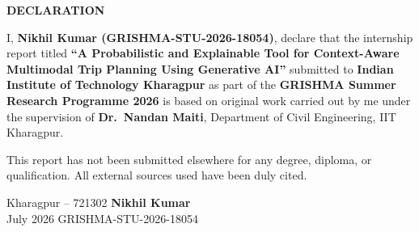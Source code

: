\thispagestyle{front}
\vspace*{0.5cm}
\begin{center}
  \textbf{\Large DECLARATION}
\end{center}
\vspace{1cm}

\noindent
I, \textbf{Nikhil Kumar (GRISHMA-STU-2026-18054)}, declare that the internship
report titled \textbf{``A Probabilistic and Explainable Tool for Context-Aware
Multimodal Trip Planning Using Generative AI''} submitted to \textbf{Indian
Institute of Technology Kharagpur} as part of the \textbf{GRISHMA Summer Research
Programme 2026} is based on original work carried out by me under the supervision
of \textbf{Dr.\ Nandan Maiti}, Department of Civil Engineering, IIT Kharagpur.

\vspace{0.5cm}
\noindent
This report has not been submitted elsewhere for any degree, diploma, or
qualification. All external sources used have been duly cited.

\vspace{3.5cm}

\noindent
Kharagpur -- 721302 \hfill \textbf{Nikhil Kumar}\\
July 2026 \hfill GRISHMA-STU-2026-18054

\newpage
